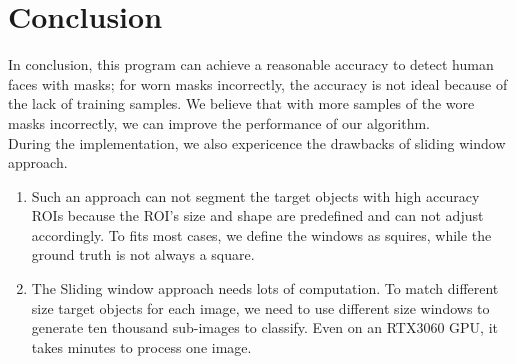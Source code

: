 \documentclass[10pt,a4paper]{report}
\begin{document}
\chapter{Conclusion}
In conclusion, this program can achieve a reasonable accuracy to detect human faces with masks; for worn masks incorrectly, the accuracy is not ideal because of the lack of training samples. We believe that with more samples of the wore masks incorrectly, we can improve the performance of our algorithm.  \\
During the implementation, we also expericence the drawbacks of sliding window approach.
\begin{enumerate}
\item Such an approach can not segment the target objects with high accuracy ROIs because the ROI's size and shape are predefined and can not adjust accordingly. To fits most cases, we define the windows as squires, while the ground truth is not always a square.
\item The Sliding window approach needs lots of computation. To match different size target objects for each image, we need to use different size windows to generate ten thousand sub-images to classify. Even on an RTX3060 GPU, it takes minutes to process one image.

\end{enumerate}



\end{document}
